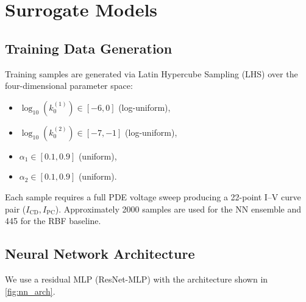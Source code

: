 \documentclass[11pt,a4paper]{article}
\newcommand{\kzero}{k_0}
\begin{document}
\section{Surrogate Models}\label{sec:surrogate}

\subsection{Training Data Generation}\label{sec:training_data}

Training samples are generated via Latin Hypercube Sampling (LHS) over
the four-dimensional parameter space:
\begin{itemize}
  \item $\log_{10}(\kzero^{(1)}) \in [-6, 0]$ \quad (log-uniform),
  \item $\log_{10}(\kzero^{(2)}) \in [-7, -1]$ \quad (log-uniform),
  \item $\alpha_1 \in [0.1, 0.9]$ \quad (uniform),
  \item $\alpha_2 \in [0.1, 0.9]$ \quad (uniform).
\end{itemize}
Each sample requires a full PDE voltage sweep producing a 22-point I--V
curve pair ($I_{\mathrm{CD}}, I_{\mathrm{PC}}$). Approximately 2000
samples are used for the NN ensemble and 445 for the RBF baseline.

\subsection{Neural Network Architecture}\label{sec:nn_arch}

We use a residual MLP (ResNet-MLP) with the architecture shown in
\cref{fig:nn_arch}.
\end{document}
